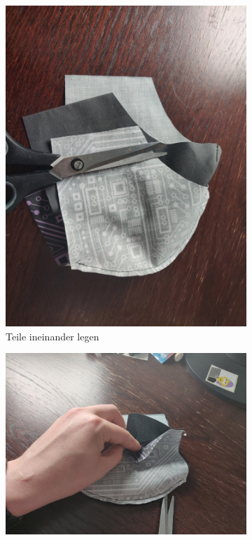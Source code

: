 \documentclass[12pt,parskip=full]{scrartcl}
\begin{document}
\begin{figure}[hb]
    \vspace{0.5cm}
    \centering
    \begin{subfigure}{0.48\textwidth}
        \centering
        \includegraphics[width = \linewidth]{Pictures/05_OuterSeam/OuterSeam1_resized.jpg}
        \caption{Teile ineinander legen}
        \label{OuterSeam1}
    \end{subfigure}
    \begin{subfigure}{0.48\textwidth}
        \centering
        \includegraphics[width = \linewidth]{Pictures/05_OuterSeam/OuterSeam2_resized.jpg}

\end{subfigure}
\end{figure}
\end{document}
